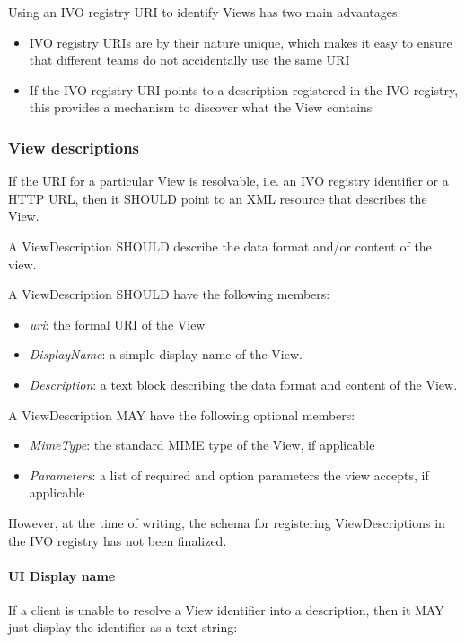 \documentclass[11pt,a4paper]{ivoa}
\begin{document}
Using an IVO registry URI to identify Views has two main advantages:

\begin{itemize}
    \item IVO registry URIs are by their nature unique, which makes it easy to ensure that different teams do not accidentally use the same URI
    \item If the IVO registry URI points to a description registered in the IVO registry, this provides a mechanism to discover what the View contains
\end{itemize}

\subsubsection{View descriptions}
\label{subsubsec:view descriptions}
If the URI for a particular View is resolvable, i.e. an IVO registry identifier or a HTTP URL, then it SHOULD point to an XML resource that describes the View.

A ViewDescription SHOULD describe the data format and/or content of the view.

A ViewDescription SHOULD have the following members:

\begin{itemize}
    \item \emph{uri}: the formal URI of the View
    \item \emph{DisplayName}: a simple display name of the View.
    \item \emph{Description}: a text block describing the data format and content of the View.
\end{itemize}

A ViewDescription MAY have the following optional members:

\begin{itemize}
    \item \emph{MimeType}: the standard MIME type of the View, if applicable
    \item \emph{Parameters}: a list of required and option parameters the view accepts, if applicable
\end{itemize}

However, at the time of writing, the schema for registering ViewDescriptions in the IVO registry has not been finalized.

\paragraph{UI Display name}
If a client is unable to resolve a View identifier into a description, then it MAY just display the identifier as a text string:
\end{document}
